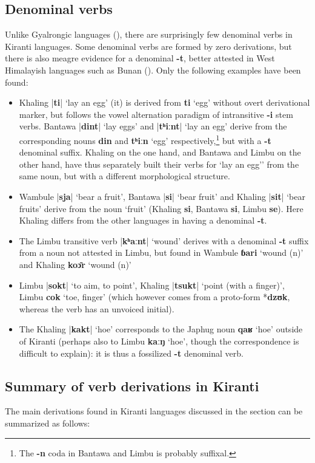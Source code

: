 \documentclass[oneside,a4paper,11pt]{article}
\newcommand{\ipa}[1]{\textbf{{\phon\mbox{#1}}}} %
\newcommand{\dhatu}[2]{|\ipa{#1}| `#2'}
\begin{document}
\subsection{Denominal verbs} \label{sec:denom}
Unlike Gyalrongic languages (\citealt{jacques14antipassive}), there are surprisingly few denominal verbs in Kiranti languages. Some denominal verbs are formed by zero derivations, but there is also meagre evidence for a denominal \ipa{-t}, better attested in West Himalayish languages such as Bunan (\citealt[426]{widmer14bunan}). Only the following examples have been found:
\begin{itemize}
\item Khaling \dhatu{ti}{lay an egg} (it) is derived from \ipa{ti} `egg' without overt derivational marker, but follows the vowel alternation paradigm of intransitive \ipa{-i} stem verbs. Bantawa \dhatu{dint}{lay eggs} and \dhatu{tʰiːnt}{lay an egg} derive from the corresponding nouns  \ipa{din} and \ipa{tʰiːn} `egg' respectively,\footnote{The \ipa{-n} coda in Bantawa and Limbu is probably suffixal.} but with a \ipa{-t} denominal suffix. Khaling on the one hand, and Bantawa and Limbu on the other hand, have thus separately built their verbs for `lay an egg'' from the same noun, but with a different morphological structure.
\item Wambule \dhatu{sja}{bear a fruit}, Bantawa  \dhatu{si}{bear fruit} and Khaling \dhatu{sit}{bear fruits} derive from the noun `fruit' (Khaling \ipa{si},  Bantawa \ipa{si}, Limbu \ipa{se}). Here Khaling differs from the other languages in having a denominal \ipa{-t}.
 \item The Limbu transitive verb \dhatu{kʰaːnt}{wound} derives with a denominal \ipa{-t} suffix from a noun not attested in Limbu, but found in Wambule \ipa{ɓari} `wound (n)' and Khaling \ipa{koɔ̄r} `wound (n)'
 \item Limbu \dhatu{sokt}{to aim, to point}, Khaling \dhatu{tsukt}{point (with a finger)}, Limbu \ipa{cok} `toe, finger' (which however comes from a proto-form *\ipa{dzʊk}, whereas the verb has an unvoiced initial).
 \item The Khaling \dhatu{kakt}{hoe} corresponds to the Japhug noun \ipa{qaʁ} `hoe' outside of Kiranti (perhaps also to Limbu \ipa{kaːŋ} `hoe', though the correspondence is difficult to explain): it is thus a fossilized \ipa{-t} denominal verb.
\end{itemize}  

\subsection{Summary of verb derivations in Kiranti}
The main derivations found in Kiranti languages discussed in the section can be summarized as follows:
\end{document}
